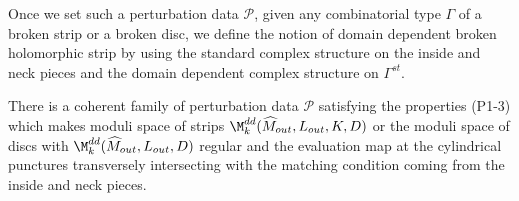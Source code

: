 \noindent Once we set such a perturbation data $\mathcal{P}$, given any combinatorial type $\Gamma$ of a broken strip or a broken disc, we define the notion of domain dependent broken holomorphic strip by using the standard complex structure on the inside and neck pieces and the domain dependent complex structure on $\Gamma^{st}$.      


\begin{Theorem} \label{thm:outtrans}
There is a coherent family of perturbation data $\mathcal{P}$ satisfying the properties (P1-3) which makes moduli space of strips $\M^{dd}_k(\widehat M_{out},L_{out},K,D)$ or the moduli space of discs with $\M^{dd}_k(\widehat M_{out},L_{out},D)$ regular and the evaluation map at the cylindrical punctures transversely intersecting with the matching condition coming from the inside and neck pieces.
\end{Theorem}

